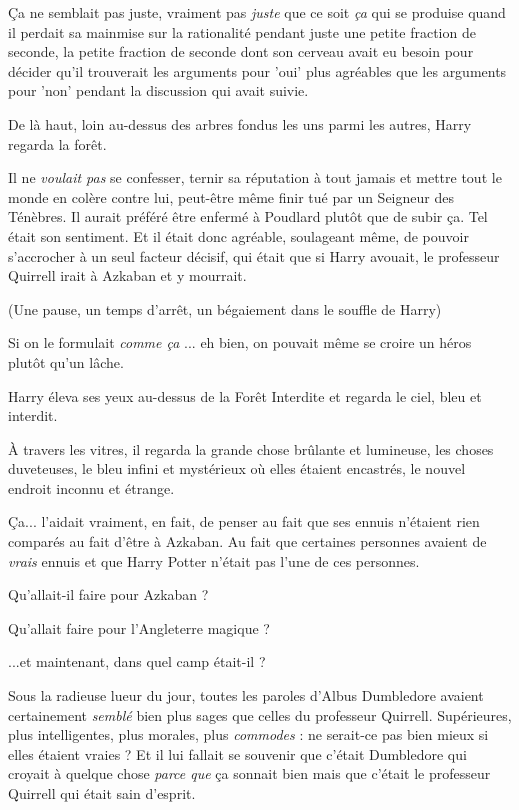 Ça ne semblait pas juste, vraiment pas \emph{juste } que ce soit \emph{ça}  qui se produise quand il perdait sa mainmise sur la rationalité pendant juste une petite fraction de seconde, la petite fraction de seconde dont son cerveau avait eu besoin pour décider qu'il trouverait les arguments pour 'oui' plus agréables que les arguments pour 'non' pendant la discussion qui avait suivie.

De là haut, loin au-dessus des arbres fondus les uns parmi les autres, Harry regarda la forêt.

Il ne \emph{voulait pas } se confesser, ternir sa réputation à tout jamais et mettre tout le monde en colère contre lui, peut-être même finir tué par un Seigneur des Ténèbres. Il aurait préféré être enfermé à Poudlard plutôt que de subir ça. Tel était son sentiment. Et il était donc agréable, soulageant même, de pouvoir s'accrocher à un seul facteur décisif, qui était que si Harry avouait, le professeur Quirrell irait à Azkaban et y mourrait.

(Une pause, un temps d'arrêt, un bégaiement dans le souffle de Harry)

Si on le formulait \emph{comme ça} ... eh bien, on pouvait même se croire un héros plutôt qu'un lâche.

Harry éleva ses yeux au-dessus de la Forêt Interdite et regarda le ciel, bleu et interdit.

À travers les vitres, il regarda la grande chose brûlante et lumineuse, les choses duveteuses, le bleu infini et mystérieux où elles étaient encastrés, le nouvel endroit inconnu et étrange.

Ça... l'aidait vraiment, en fait, de penser au fait que ses ennuis n'étaient rien comparés au fait d'être à Azkaban. Au fait que certaines personnes avaient de \emph{vrais}  ennuis et que Harry Potter n'était pas l'une de ces personnes.

Qu'allait-il faire pour Azkaban ?

Qu'allait faire pour l'Angleterre magique ?

...et maintenant, dans quel camp était-il ?

Sous la radieuse lueur du jour, toutes les paroles d'Albus Dumbledore avaient certainement \emph{semblé}  bien plus sages que celles du professeur Quirrell. Supérieures, plus intelligentes, plus morales, plus \emph{commodes}  : ne serait-ce pas bien mieux si elles étaient vraies ? Et il lui fallait se souvenir que c'était Dumbledore qui croyait à quelque chose \emph{parce que}  ça sonnait bien mais que c'était le professeur Quirrell qui était sain d'esprit.

